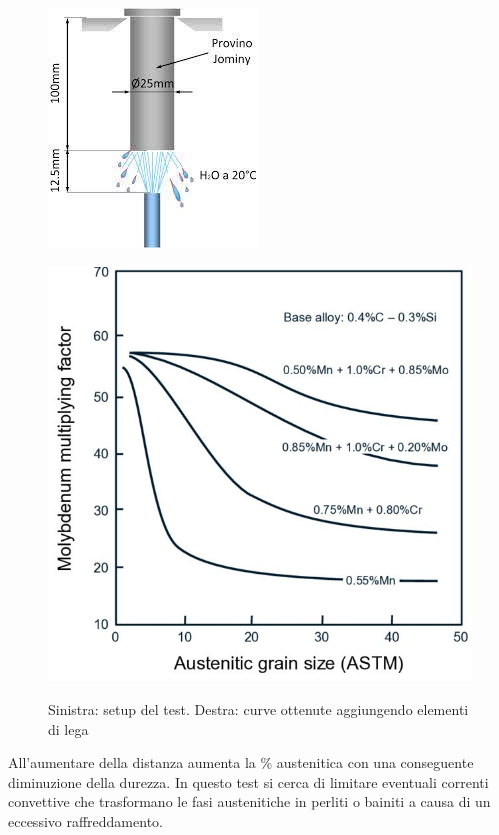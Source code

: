 \begin{figure}[h]
  \begin{minipage}[b]{0.5\linewidth}
    \centering
    \includegraphics[width=0.6\linewidth]{acciaio e transizioni di fase/jominy test.jpg}
    \label{jominy-test}
  \end{minipage}
  \begin{minipage}[b]{0.5\linewidth}
    \centering
    \includegraphics[width=0.7\linewidth]{acciaio e transizioni di fase/JOMINY-chart.jpg}
    \label{jominy-chart}  

  \end{minipage}
  \caption{Sinistra: setup del test. Destra: curve ottenute aggiungendo elementi di lega}
\end{figure}

All'aumentare della distanza aumenta la \% austenitica con una conseguente diminuzione della durezza. In questo test si cerca di limitare eventuali correnti convettive che trasformano le fasi austenitiche in perliti o bainiti a causa di un eccessivo raffreddamento.

